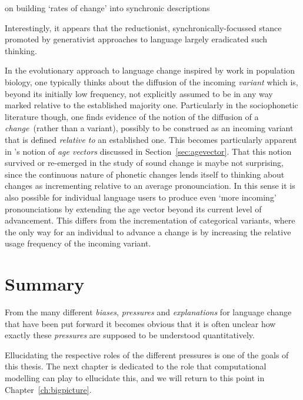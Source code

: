 \citep{Bailey1970} on building `rates of change' into synchronic descriptions

Interestingly, it appears that the reductionist, synchronically-focussed stance promoted by generativist approaches to language largely eradicated such thinking.

In the evolutionary approach to language change inspired by work in population biology, one typically thinks about the diffusion of the incoming \emph{variant} which is, beyond its initially low frequency, not explicitly assumed to be in any way marked relative to the established majority one.
Particularly in the sociophonetic literature though, one finds evidence of the notion of the diffusion of a \emph{change}~(rather than a variant), possibly to be construed as an incoming variant that is defined \emph{relative to} an established one. This becomes particularly apparent in \citet{Labov2001}'s notion of \emph{age vectors} discussed in Section~\ref{sec:agevector}. 
That this notion survived or re-emerged in the study of sound change is maybe not surprising, since the continuous nature of phonetic changes lends itself to thinking about changes as incrementing relative to an average pronounciation. In this sense it is also possible for individual language users to produce even `more incoming' pronounciations by extending the age vector beyond its current level of advancement. This differs from the incrementation of categorical variants, where the only way for an individual to advance a change is by increasing the relative usage frequency of the incoming variant.

\section{Summary}

From the many different \emph{biases}, \emph{pressures} and \emph{explanations} for language change that have been put forward it becomes obvious that it is often unclear how exactly these \emph{pressures} are supposed to be understood quantitatively.

Ellucidating the respective roles of the different pressures is one of the goals of this thesis. The next chapter is dedicated to the role that computational modelling can play to ellucidate this, and we will return to this point in Chapter~\ref{ch:bigpicture}.
